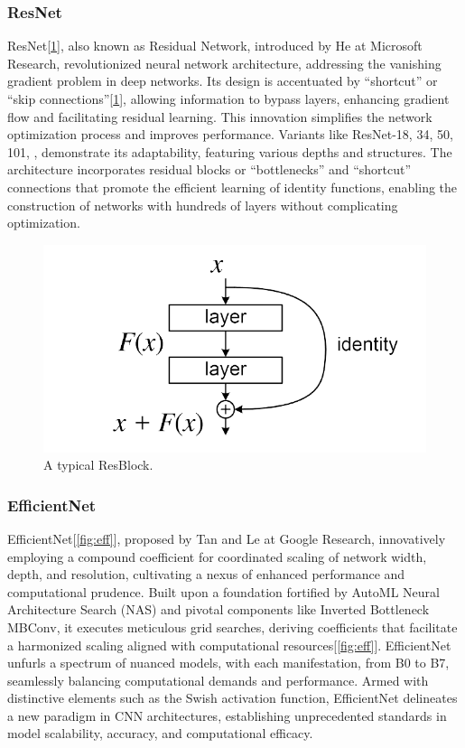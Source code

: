 \documentclass[10pt,twocolumn,letterpaper]{article}
\begin{document}
\subsubsection{ResNet}
ResNet[\ref{fig:resblock}], also known as Residual Network, introduced by He \etal\cite{he2016deep} at Microsoft Research, revolutionized neural network architecture, addressing the vanishing gradient problem\cite{he2016deep, simonyan2014very} in deep networks. Its design is accentuated by ``shortcut'' or ``skip connections''[\ref{fig:resblock}], allowing information to bypass layers, enhancing gradient flow and facilitating residual learning\cite{he2016deep}. This innovation simplifies the network optimization process and improves performance. Variants like ResNet-18, 34, 50, 101, \etc, demonstrate its adaptability, featuring various depths and structures. The architecture incorporates residual blocks or ``bottlenecks'' and ``shortcut'' connections that promote the efficient learning of identity functions, enabling the construction of networks with hundreds of layers without complicating optimization.
\begin{figure}[h]
	\centering
	\includegraphics[height=0.3\columnwidth]{resblock}
	\caption{A typical ResBlock\cite{he2016deep}.}
	\label{fig:resblock}
\end{figure}

\subsubsection{EfficientNet}
EfficientNet[\ref{fig:eff}], proposed by Tan and Le\cite{tan2019efficientnet} at Google Research, innovatively employing a compound coefficient for coordinated scaling of network width, depth, and resolution, cultivating a nexus of enhanced performance and computational prudence. Built upon a foundation fortified by AutoML Neural Architecture Search (NAS) and pivotal components like Inverted Bottleneck MBConv, it executes meticulous grid searches, deriving coefficients that facilitate a harmonized scaling aligned with computational resources\cite{tan2019efficientnet}[\ref{fig:eff}]. EfficientNet unfurls a spectrum of nuanced models, with each manifestation, from B0 to B7, seamlessly balancing computational demands and performance. Armed with distinctive elements such as the Swish activation function\cite{tan2019efficientnet, ramachandran2017searching}, EfficientNet delineates a new paradigm in CNN architectures, establishing unprecedented standards in model scalability, accuracy, and computational efficacy.
\end{document}

